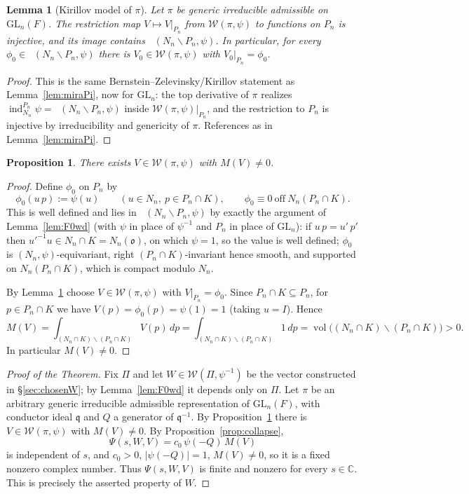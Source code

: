 \documentclass[12pt]{article}
\newcommand{\GL}{\mathrm{GL}}
\newcommand{\oo}{\mathfrak{o}}
\newcommand{\qq}{\mathfrak{q}}
\newcommand{\Wmod}{\mathcal{W}}
\DeclareMathOperator{\Cc}{C_c^\infty}
\newtheorem{lemma}{Lemma}
\newtheorem{proposition}{Proposition}
\begin{document}
\begin{lemma}[Kirillov model of $\pi$]\label{lem:miraPiSmall}
Let $\pi$ be generic irreducible admissible on $\GL_n(F)$. The restriction map
$V\mapsto V|_{P_n}$ from $\Wmod(\pi,\psi)$ to functions on $P_n$ is injective, and
its image contains $\Cc(N_n\backslash P_n,\psi)$. In particular, for every
$\phi_0\in\Cc(N_n\backslash P_n,\psi)$ there is $V_0\in\Wmod(\pi,\psi)$ with
$V_0|_{P_n}=\phi_0$.
\end{lemma}

\begin{proof}
This is the same Bernstein--Zelevinsky/Kirillov statement as Lemma~\ref{lem:miraPi},
now for $\GL_n$: the top derivative of $\pi$ realizes
$\operatorname{ind}_{N_n}^{P_n}\psi=\Cc(N_n\backslash P_n,\psi)$ inside
$\Wmod(\pi,\psi)|_{P_n}$, and the restriction to $P_n$ is injective by irreducibility
and genericity of $\pi$. References as in Lemma~\ref{lem:miraPi}.
\end{proof}

\begin{proposition}\label{prop:nonvanish}
There exists $V\in\Wmod(\pi,\psi)$ with $M(V)\neq0$.
\end{proposition}

\begin{proof}
Define $\phi_0$ on $P_n$ by
\[
  \phi_0(u\,p):=\psi(u)\qquad(u\in N_n,\ p\in P_n\cap K),\qquad
  \phi_0\equiv0\ \text{off}\ N_n(P_n\cap K).
\]
This is well defined and lies in $\Cc(N_n\backslash P_n,\psi)$ by exactly the
argument of Lemma~\ref{lem:F0wd} (with $\psi$ in place of $\psi^{-1}$ and $P_n$ in
place of $\GL_n$): if $u\,p=u'\,p'$ then $u'^{-1}u\in N_n\cap K=N_n(\oo)$, on which
$\psi=1$, so the value is well defined; $\phi_0$ is $(N_n,\psi)$-equivariant, right
$(P_n\cap K)$-invariant hence smooth, and supported on $N_n(P_n\cap K)$, which is
compact modulo $N_n$.

By Lemma~\ref{lem:miraPiSmall} choose $V\in\Wmod(\pi,\psi)$ with $V|_{P_n}=\phi_0$.
Since $P_n\cap K\subseteq P_n$, for $p\in P_n\cap K$ we have $V(p)=\phi_0(p)=\psi(1)=1$
(taking $u=I$). Hence
\[
  M(V)=\int_{(N_n\cap K)\backslash(P_n\cap K)}V(p)\,dp
      =\int_{(N_n\cap K)\backslash(P_n\cap K)}1\,dp
      =\operatorname{vol}\bigl((N_n\cap K)\backslash(P_n\cap K)\bigr)>0 .
\]
In particular $M(V)\neq0$.
\end{proof}

\begin{proof}[Proof of the Theorem]
Fix $\Pi$ and let $W\in\Wmod(\Pi,\psi^{-1})$ be the vector constructed in
\S\ref{sec:chosenW}; by Lemma~\ref{lem:F0wd} it depends only on $\Pi$. Let $\pi$ be
an arbitrary generic irreducible admissible representation of $\GL_n(F)$, with
conductor ideal $\qq$ and $Q$ a generator of $\qq^{-1}$. By
Proposition~\ref{prop:nonvanish} there is $V\in\Wmod(\pi,\psi)$ with $M(V)\neq0$. By
Proposition~\ref{prop:collapse},
\[
  \Psi(s,W,V)=c_0\,\psi(-Q)\,M(V)
\]
is independent of $s$, and $c_0>0$, $|\psi(-Q)|=1$, $M(V)\neq0$, so it is a fixed
nonzero complex number. Thus $\Psi(s,W,V)$ is finite and nonzero for every
$s\in\mathbb C$. This is precisely the asserted property of $W$.
\end{proof}
\end{document}

